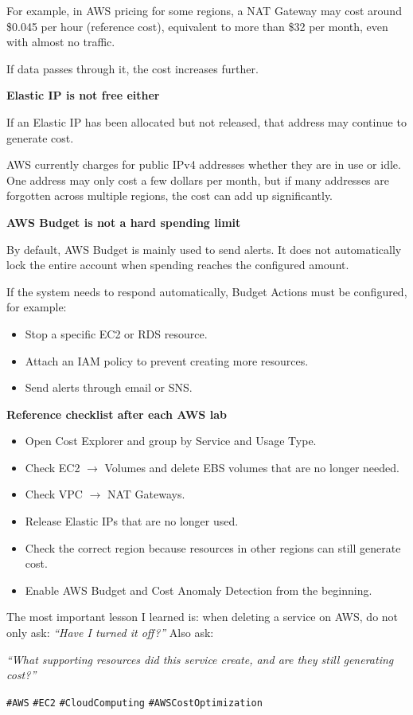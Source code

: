 For example, in AWS pricing for some regions, a NAT Gateway may cost
around \$0.045 per hour (reference cost), equivalent to more than \$32
per month, even with almost no traffic.

If data passes through it, the cost increases further.

\vspace{0.5em}\noindent\textbf{Elastic IP is not free
either}\par

If an Elastic IP has been allocated but not released, that address may
continue to generate cost.

AWS currently charges for public IPv4 addresses whether they are in use
or idle. One address may only cost a few dollars per month, but if many
addresses are forgotten across multiple regions, the cost can add up
significantly.

\vspace{0.5em}\noindent\textbf{AWS Budget is not a hard spending
limit}\par

By default, AWS Budget is mainly used to send alerts. It does not
automatically lock the entire account when spending reaches the
configured amount.

If the system needs to respond automatically, Budget Actions must be
configured, for example:

\begin{itemize}
\tightlist
\item
  Stop a specific EC2 or RDS resource.
\item
  Attach an IAM policy to prevent creating more resources.
\item
  Send alerts through email or SNS.
\end{itemize}

\vspace{0.5em}\noindent\textbf{Reference checklist after each AWS
lab}\par

\begin{itemize}
\tightlist
\item
  Open Cost Explorer and group by Service and Usage Type.
\item
  Check EC2 \(\rightarrow\) Volumes and delete EBS volumes that are no
  longer needed.
\item
  Check VPC \(\rightarrow\) NAT Gateways.
\item
  Release Elastic IPs that are no longer used.
\item
  Check the correct region because resources in other regions can still
  generate cost.
\item
  Enable AWS Budget and Cost Anomaly Detection from the beginning.
\end{itemize}

The most important lesson I learned is: when deleting a service on AWS,
do not only ask: \emph{``Have I turned it off?''} Also ask:

\emph{``What supporting resources did this service create, and are they
still generating cost?''}

\texttt{\#AWS} \texttt{\#EC2} \texttt{\#CloudComputing}
\texttt{\#AWSCostOptimization}
